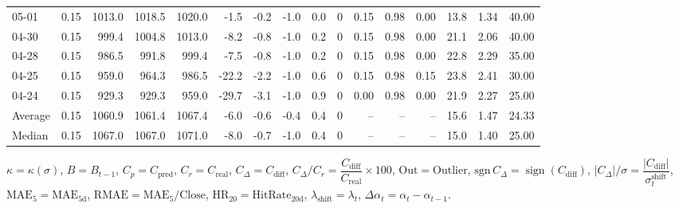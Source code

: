 \begin{threeparttable}
{\begin{tabular}{lrrrrrrrrrrrrrrr}
  05-01 &     0.15 & 1013.0 & 1018.5 & 1020.0 &       -1.5 &           -0.2 &                     -1.0 &                 0.0 &              0 &       0.15 &      0.98 &           0.00 &             13.8 &            1.34 &                  40.00 \\
  04-30 &     0.15 &  999.4 & 1004.8 & 1013.0 &       -8.2 &           -0.8 &                     -1.0 &                 0.2 &              0 &       0.15 &      0.98 &           0.00 &             21.1 &            2.06 &                  40.00 \\
  04-28 &     0.15 &  986.5 &  991.8 &  999.4 &       -7.5 &           -0.8 &                     -1.0 &                 0.2 &              0 &       0.15 &      0.98 &           0.00 &             22.8 &            2.29 &                  35.00 \\
  04-25 &     0.15 &  959.0 &  964.3 &  986.5 &      -22.2 &           -2.2 &                     -1.0 &                 0.6 &              0 &       0.15 &      0.98 &           0.15 &             23.8 &            2.41 &                  30.00 \\
  04-24 &     0.15 &  929.3 &  929.3 &  959.0 &      -29.7 &           -3.1 &                     -1.0 &                 0.9 &              0 &       0.00 &      0.98 &           0.00 &             21.9 &            2.27 &                  25.00 \\
Average &     0.15 & 1060.9 & 1061.4 & 1067.4 &       -6.0 &           -0.6 &                     -0.4 &                 0.4 &              0 &         -- &        -- &             -- &             15.6 &            1.47 &                  24.33 \\
 Median &     0.15 & 1067.0 & 1067.0 & 1071.0 &       -8.0 &           -0.7 &                     -1.0 &                 0.4 &              0 &         -- &        -- &             -- &             15.0 &            1.40 &                  25.00 \\
\bottomrule
\end{tabular}
}
\begin{tablenotes}\footnotesize
\item $\kappa=\kappa(\sigma)$, $B=B_{t-1}$, $C_p=C_{\text{pred}}$, $C_r=C_{\text{real}}$, $C_\Delta=C_{\text{diff}}$, $C_\Delta/C_r=\dfrac{C_{\text{diff}}}{C_{\text{real}}}\times100$, $\mathrm{Out}=\text{Outlier}$, $\mathrm{sgn}\,C_\Delta=\operatorname{sign}(C_{\text{diff}})$, $|C_\Delta|/\sigma=\dfrac{|C_{\text{diff}}|}{\sigma_t^{\text{shift}}}$, $\mathrm{MAE}_5=\mathrm{MAE}_{5\text{d}}$, $\mathrm{RMAE}= \mathrm{MAE}_5 / \text{Close}$, $\mathrm{HR}_{20}=\mathrm{HitRate}_{20\text{d}}$, 
$\lambda_{\text{shift}}=\lambda_t$, 
$\Delta\alpha_t=\alpha_t-\alpha_{t-1}$.
\end{tablenotes}
\end{threeparttable}
\endgroup

